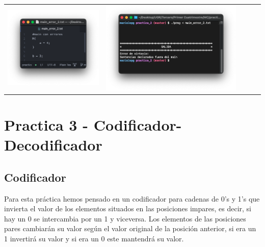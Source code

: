 \begin{table}[H]
	\centering
	\begin{tabular}{lllll}
		\multicolumn{1}{c}{\includegraphics[scale=0.5]{../practica_2/images/programa_err_2.png}} & \multicolumn{1}{c}{\includegraphics[scale=0.45]{../practica_2/images/main_err_ejec_2.png}}
	\end{tabular}
\end{table}

\newpage
\section{Practica 3 - Codificador-Decodificador}
\subsection{Codificador}

Para esta práctica hemos pensado en un codificador para cadenas de 0's y 1's que invierta el valor de los elementos situados en las posiciones impares, es decir, si hay un 0 se intercambia por un 1 y viceversa. Los elementos
de las posiciones pares cambiarán su valor según el valor original de la posición anterior, si era un 1 invertirá su valor y si era un 0 este mantendrá su valor.

